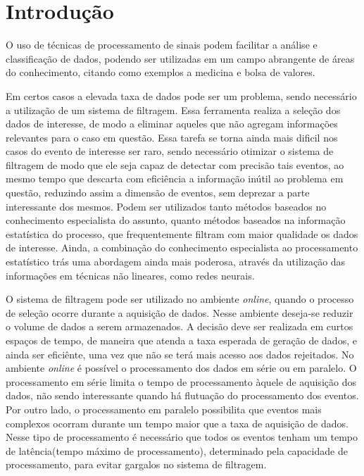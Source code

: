 \chapter{Introdução}

O uso de técnicas de processamento de sinais podem facilitar a análise e
classificação de dados, podendo ser utilizadas em um campo abrangente de áreas
do conhecimento, citando como exemplos a medicina e bolsa de valores.

Em certos casos a elevada taxa de dados pode ser um problema, sendo necessário a
utilização de um sistema de filtragem. Essa ferramenta realiza a seleção dos dados 
de interesse, de modo a eliminar aqueles que não agregam informações relevantes 
para o caso em questão. Essa tarefa se torna ainda mais dificil nos casos do evento 
de interesse ser raro, sendo necessário otimizar o sistema de filtragem de modo que 
ele seja capaz de detectar com precisão tais eventos, ao mesmo tempo que descarta 
com eficiência a informação inútil ao problema em questão, reduzindo assim a dimensão 
de eventos, sem deprezar a parte interessante dos mesmos.
Podem ser utilizados tanto métodos baseados no conhecimento especialista do
assunto, quanto métodos baseados na informação estatística do processo, 
que frequentemente filtram com maior qualidade os dados de interesse. Ainda, 
a combinação do conhecimento especialista ao processamento 
estatístico trás uma abordagem ainda mais poderosa, através da utilização das informações 
em técnicas não lineares, como redes neurais.

O sistema de filtragem pode ser utilizado no ambiente {\it online},
quando o processo de seleção ocorre durante a aquisição de dados. Nesse ambiente
deseja-se reduzir o volume de dados a serem armazenados. A decisão deve ser realizada 
em curtos espaços de tempo, de maneira que atenda a taxa esperada de geração de
dados, e ainda ser eficiênte, uma vez que não se terá mais acesso aos dados
rejeitados. No ambiente {\it online} é possível o processamento dos dados em série
ou em paralelo. O processamento em série limita o tempo de processamento àquele
de aquisição dos dados, não sendo interessante quando há flutuação do
processamento dos eventos. Por outro lado, o processamento em
paralelo possibilita que eventos mais complexos ocorram durante um tempo maior
que a taxa de aquisição de dados. Nesse tipo de processamento é necessário que
todos os eventos tenham um tempo de latência(tempo máximo de processamento), determinado pela capacidade
de processamento, para evitar gargalos no sistema de filtragem.

